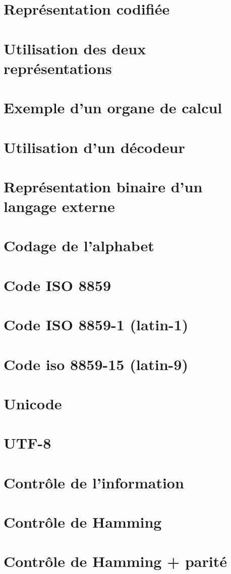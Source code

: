 	\section{Représentation codifiée}
	\section{Utilisation des deux représentations}
	\section{Exemple d'un organe de calcul}
	\section{Utilisation d'un décodeur}
	\section{Représentation binaire d'un langage externe}
	\section{Codage de l'alphabet}
	\section{Code ISO 8859}
	\section{Code ISO 8859-1 (latin-1)}
	\section{Code iso 8859-15 (latin-9)}
	\section{Unicode}
	\section{UTF-8}
	\section{Contrôle de l'information}
	\section{Contrôle de Hamming}
	\section{Contrôle de Hamming + parité}
			

